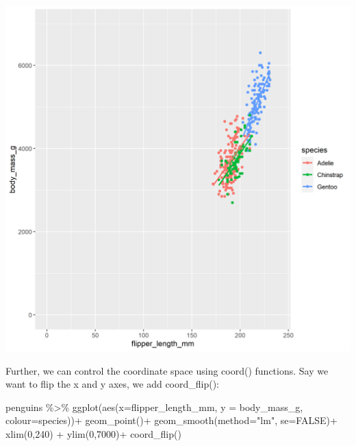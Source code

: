 \documentclass[
]{book}
\newenvironment{Shaded}{\begin{snugshade}}{\end{snugshade}}
\newcommand{\AttributeTok}[1]{\textcolor[rgb]{0.77,0.63,0.00}{#1}}
\newcommand{\ConstantTok}[1]{\textcolor[rgb]{0.00,0.00,0.00}{#1}}
\newcommand{\DecValTok}[1]{\textcolor[rgb]{0.00,0.00,0.81}{#1}}
\newcommand{\FunctionTok}[1]{\textcolor[rgb]{0.00,0.00,0.00}{#1}}
\newcommand{\NormalTok}[1]{#1}
\newcommand{\SpecialCharTok}[1]{\textcolor[rgb]{0.00,0.00,0.00}{#1}}
\newcommand{\StringTok}[1]{\textcolor[rgb]{0.31,0.60,0.02}{#1}}
\begin{document}
\includegraphics[width=0.8\linewidth]{images/zerolim}

Further, we can control the coordinate space using coord() functions. Say we want to flip the x and y axes, we add coord\_flip():

\begin{Shaded}
\begin{Highlighting}[]
\NormalTok{penguins }\SpecialCharTok{\%\textgreater{}\%} 
  \FunctionTok{ggplot}\NormalTok{(}\FunctionTok{aes}\NormalTok{(}\AttributeTok{x=}\NormalTok{flipper\_length\_mm, }
             \AttributeTok{y =}\NormalTok{ body\_mass\_g,}
             \AttributeTok{colour=}\NormalTok{species))}\SpecialCharTok{+} 
  \FunctionTok{geom\_point}\NormalTok{()}\SpecialCharTok{+}
  \FunctionTok{geom\_smooth}\NormalTok{(}\AttributeTok{method=}\StringTok{"lm"}\NormalTok{,    }
              \AttributeTok{se=}\ConstantTok{FALSE}\NormalTok{)}\SpecialCharTok{+}
  \FunctionTok{xlim}\NormalTok{(}\DecValTok{0}\NormalTok{,}\DecValTok{240}\NormalTok{) }\SpecialCharTok{+} \FunctionTok{ylim}\NormalTok{(}\DecValTok{0}\NormalTok{,}\DecValTok{7000}\NormalTok{)}\SpecialCharTok{+}
  \FunctionTok{coord\_flip}\NormalTok{()}
\end{Highlighting}
\end{Shaded}
\end{document}
